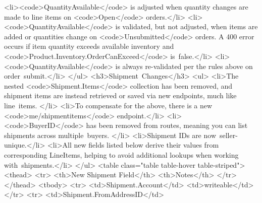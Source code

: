 \documentclass{memoir}%
\begin{document}
<li><code>QuantityAvailable</code> is adjusted when quantity changes are made to line items on <code>Open</code> orders.</li>\newline%
<li><code>QuantityAvailable</code> is validated, but not adjusted, when items are added or quantities change on <code>Unsubmitted</code> orders. A 400 error occurs if item quantity exceeds available inventory and <code>Product.Inventory.OrderCanExceed</code> is~false.</li>\newline%
<li><code>QuantityAvailable</code> is always re{-}validated per the rules above on order~submit.</li>\newline%
</ul>\newline%
<h3>Shipment~Changes</h3>\newline%
<ul>\newline%
<li>The nested <code>Shipment.Items</code> collection has been removed, and shipment items are instead retrieved or saved via new endpoints, much like line~items. </li>\newline%
<li>To compensate for the above, there is a new <code>me/shipmentitems</code> endpoint.</li>\newline%
<li><code>BuyerID</code> has been removed from routes, meaning you can list shipments across multiple~buyers. </li>\newline%
<li>Shipment IDs are now~seller{-}unique.</li>\newline%
<li>All new fields listed below derive their values from corresponding LineItems, helping to avoid additional lookups when working with~shipments.</li>\newline%
</ul>\newline%
<table class="table table{-}hover table{-}striped">\newline%
<thead>\newline%
<tr>\newline%
<th>New Shipment Field</th>\newline%
<th>Notes</th>\newline%
</tr>\newline%
</thead>\newline%
<tbody>\newline%
<tr>\newline%
<td>Shipment.Account</td>\newline%
<td>writeable</td>\newline%
</tr>\newline%
<tr>\newline%
<td>Shipment.FromAddressID</td>\newline%
\end{document}
